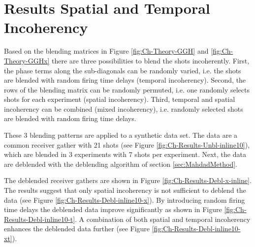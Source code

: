 \FloatBarrier

\section{Results Spatial and Temporal Incoherency}

Based on the blending matrices in Figure \ref{fig:Ch-Theory-GGH} and \ref{fig:Ch-Theory-GGHx} there are three possibilities to blend the shots incoherently. First, the phase terms along the sub-diagonals can be randomly varied, i.e. the shots are blended with random firing time delays (temporal incoherency). Second, the rows of the blending matrix can be randomly permuted, i.e. one randomly selects shots for each experiment (spatial incoherency). Third, temporal and spatial incoherency can be combined (mixed incoherency), i.e. randomly selected shots are blended with random firing time delays.

These 3 blending patterns are applied to a synthetic data set. The data are a common receiver gather with 21 shots (see Figure \ref{fig:Ch-Results-Unbl-inline10}), which are blended in 3 experiments with 7 shots per experiment. Next, the data are deblended with the deblending algorithm of section \ref{sec:MahdadMethod}. 

The deblended receiver gathers are shown in Figure \ref{fig:Ch-Results-Debl-x-inline}. The results suggest that only spatial incoherency is not sufficient to deblend the data (see Figure \ref{fig:Ch-Results-Debl-inline10-x}). By introducing random firing time delays the deblended data improve significantly as shown in Figure \ref{fig:Ch-Results-Debl-inline10-t}. A combination of both spatial and temporal incoherency enhances the deblended data further (see Figure \ref{fig:Ch-Results-Debl-inline10-xt}).


